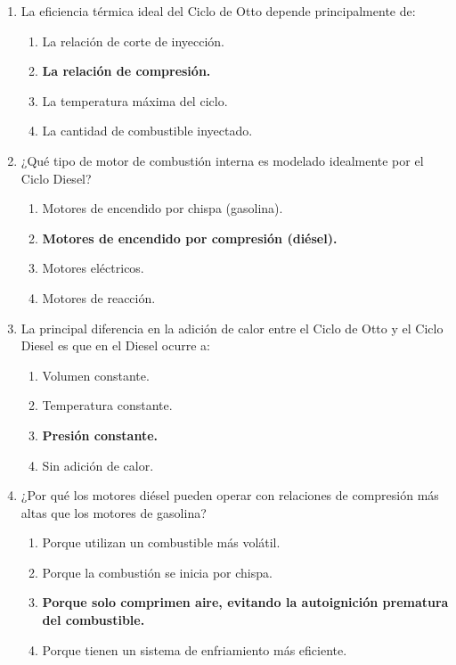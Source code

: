 \documentclass{article}
\begin{document}
\begin{enumerate}[label=\arabic*.]
    \item La eficiencia térmica ideal del Ciclo de Otto depende principalmente de:
    \begin{enumerate}[label=\alph*)]
        \item La relación de corte de inyección.
        \item \textbf{La relación de compresión.}
        \item La temperatura máxima del ciclo.
        \item La cantidad de combustible inyectado.
    \end{enumerate}

    \item ¿Qué tipo de motor de combustión interna es modelado idealmente por el Ciclo Diesel?
    \begin{enumerate}[label=\alph*)]
        \item Motores de encendido por chispa (gasolina).
        \item \textbf{Motores de encendido por compresión (diésel).}
        \item Motores eléctricos.
        \item Motores de reacción.
    \end{enumerate}

    \item La principal diferencia en la adición de calor entre el Ciclo de Otto y el Ciclo Diesel es que en el Diesel ocurre a:
    \begin{enumerate}[label=\alph*)]
        \item Volumen constante.
        \item Temperatura constante.
        \item \textbf{Presión constante.}
        \item Sin adición de calor.
    \end{enumerate}

    \item ¿Por qué los motores diésel pueden operar con relaciones de compresión más altas que los motores de gasolina?
    \begin{enumerate}[label=\alph*)]
        \item Porque utilizan un combustible más volátil.
        \item Porque la combustión se inicia por chispa.
        \item \textbf{Porque solo comprimen aire, evitando la autoignición prematura del combustible.}
        \item Porque tienen un sistema de enfriamiento más eficiente.
    \end{enumerate}


\end{enumerate}
\end{document}

